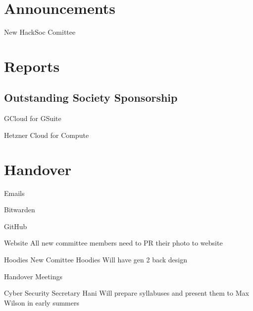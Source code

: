 \documentclass[11pt,hacksoc]{meetingmins}
\begin{document}
\maketitle

\section{Announcements}
\begin{items}
  \item New HackSoc Comittee

\end{items}

\section{Reports}

\subsection{Outstanding Society Sponsorship}
\begin{hiddensubitems}
\item GCloud for GSuite
\item Hetzner Cloud for Compute
\end{hiddensubitems}

\section{Handover}
\begin{items}
\item Emails
\item Bitwarden
\item GitHub
\item Website
  \subitem All new committee members need to PR their photo to website
\item Hoodies 
  \subitem New Comittee Hoodies Will have gen 2 back design
\item Handover Meetings
\item Cyber Security Secretary
  \subitem Hani Will prepare syllabuses and present them to Max Wilson in early summers
\end{items}
\end{document}
